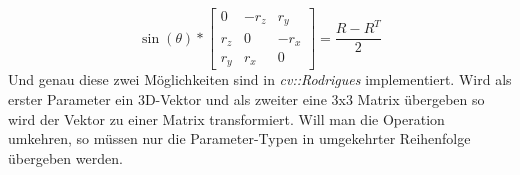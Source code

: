 \begin{equation}
\sin(\theta) * 
\begin{bmatrix}
0 & -r_z & r_y \\
r_z & 0 & -r_x \\
r_y & r_x & 0
\end{bmatrix}
= 
\frac{R - R^T}{2}
\end{equation}
\noindent
Und genau diese zwei Möglichkeiten sind in \textit{cv::Rodrigues} implementiert. Wird als erster Parameter ein 3D-Vektor und als zweiter eine 3x3 Matrix übergeben so wird der Vektor zu einer Matrix transformiert. Will man die Operation umkehren, so müssen nur die Parameter-Typen in umgekehrter Reihenfolge übergeben werden.
